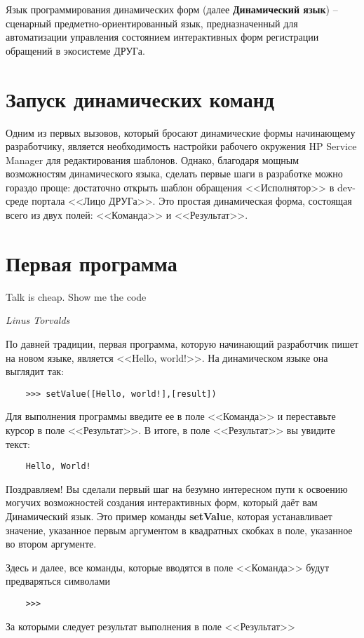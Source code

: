 \documentclass[../index.tex]{subfiles}
\begin{document}
        Язык программирования динамических форм (далее \textbf{Динамический язык}) -- сценарный предметно-ориентированный язык, предназначенный для автоматизации управления состоянием 
        интерактивных форм регистрации обращений в экосистеме ДРУГа.
        
	\section{Запуск динамических команд}
	Одним из первых вызовов, который бросают динамические формы начинающему разработчику, является необходимость настройки рабочего окружения HP Service Manager для редактирования шаблонов. Однако, благодаря мощным возможностям динамического языка, сделать первые шаги в разработке можно гораздо проще: достаточно открыть шаблон обращения <<Исполнятор>> в dev-среде портала <<Лицо ДРУГа>>. Это простая динамическая форма, состоящая всего из двух полей: <<Команда>> и <<Результат>>.
	
	\section{Первая программа}
		
	\epigraph{Talk is cheap. Show me the code}{\textit{Linus Torvalds}}
	
	По давней традиции, первая программа, которую начинающий разработчик пишет на новом языке, является <<Hello, world!>>. На динамическом языке она выглядит так:
	\begin{verbatim}
	>>> setValue([Hello, world!],[result])
	\end{verbatim}
	
	Для выполнения программы введите ее в поле <<Команда>> и переставьте курсор в поле <<Результат>>. В итоге, в поле <<Результат>> вы увидите текст:
	
	\begin{verbatim}
	Hello, World!
	\end{verbatim}
	
	Поздравляем! Вы сделали первый шаг на безумно интересном пути к освоению могучих возможностей создания интерактивных форм, который даёт вам Динамический язык.
	Это пример команды {\bf setValue}, которая устанавливает значение, указанное первым аргументом в квадратных скобках в поле, указанное во втором аргументе.
	
	Здесь и далее, все команды, которые вводятся в поле <<Команда>> будут предваряться символами 	\begin{verbatim}
	>>>
	\end{verbatim}	За которыми следует результат выполнения в поле <<Результат>>
	
\end{document}

